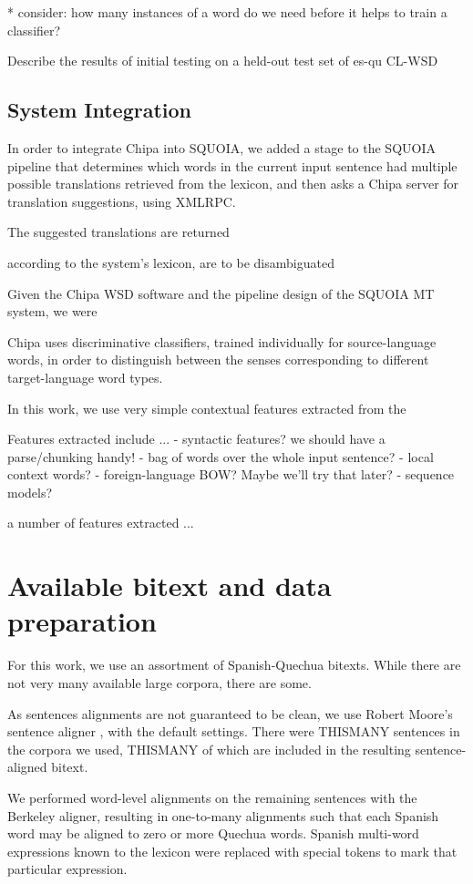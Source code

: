 \documentclass[10pt, a4paper]{article}
\begin{document}
* consider: how many instances of a word do we need before it helps to train a
classifier?

Describe the results of initial testing on a held-out test set of es-qu CL-WSD



\subsection{System Integration}
In order to integrate Chipa into SQUOIA, we added a stage to the SQUOIA
pipeline that determines which words in the current input sentence had multiple
possible translations retrieved from the lexicon, and then asks a Chipa
server for translation suggestions, using XMLRPC.

The suggested translations are returned 


according to the system's lexicon, 
are to be disambiguated 

Given the Chipa WSD software and the pipeline design of the SQUOIA MT system,
we were





Chipa uses discriminative classifiers, trained individually for source-language
words, in order to distinguish between the senses corresponding to different
target-language word types.

In this work, we use very simple contextual features extracted from the 

Features extracted include ...
- syntactic features? we should have a parse/chunking handy!
- bag of words over the whole input sentence?
- local context words?
- foreign-language BOW? Maybe we'll try that later?
- sequence models?

a number of features extracted ...


\section{Available bitext and data preparation}
For this work, we use an assortment of Spanish-Quechua bitexts.
While there are not very many available large corpora, there are some.

As sentences alignments are not guaranteed to be clean, we use Robert Moore's
sentence aligner \cite{DBLP:conf/amta/Moore02}, with the default settings.
There were THISMANY sentences in the corpora we used, THISMANY of which are
included in the resulting sentence-aligned bitext.

We performed word-level alignments on the remaining sentences with the Berkeley
aligner, resulting in one-to-many alignments such that each Spanish word may be
aligned to zero or more Quechua words. Spanish multi-word expressions known to
the lexicon were replaced with special tokens to mark that particular
expression.
\end{document}
